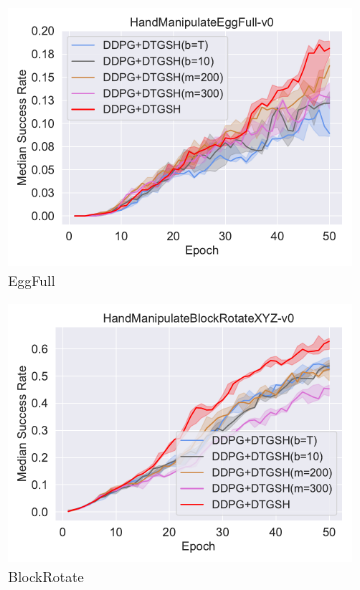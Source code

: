\begin{figure}[t]
\begin{subfigure}[t]{0.33\textwidth}
    \includegraphics[width=\textwidth]{figures/chapter4/HandManipulateEggFull-v0_ab2.pdf}
    \caption{EggFull}
    \label{subfig:baseline_handegg_ab2}
  \end{subfigure}\hfill
  \begin{subfigure}[t]{0.33\textwidth}
    \includegraphics[width=\textwidth]{figures/chapter4/HandManipulateBlockRotateXYZ-v0_ab2.pdf}
    \caption{BlockRotate}
    \label{subfig:baseline_handblock_ab2}
  \end{subfigure}\hfill
  \begin{subfigure}[t]{0.33\textwidth}

\end{subfigure}
\end{figure}
